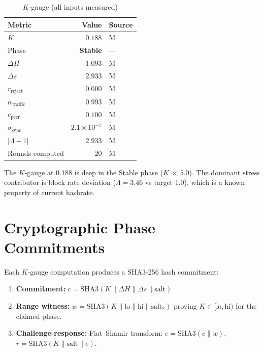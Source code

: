 \documentclass[11pt,a4paper,twocolumn]{article}
\begin{document}
\begin{table}[H]
\centering
\caption{$K$-gauge (all inputs \textcolor{measured}{measured})}
\label{tab:klive}
\begin{tabular}{@{}lrl@{}}
\toprule
\textbf{Metric} & \textbf{Value} & \textbf{Source} \\
\midrule
$K$                  & $0.188$       & \textcolor{measured}{M} \\
Phase                & \textbf{Stable} & --- \\
$\Delta H$           & $1.093$       & \textcolor{measured}{M} \\
$\Delta s$           & $2.933$       & \textcolor{measured}{M} \\
$r_{\text{reject}}$  & $0.000$       & \textcolor{measured}{M} \\
$\alpha_{\text{traffic}}$ & $0.993$  & \textcolor{measured}{M} \\
$c_{\text{peer}}$    & $0.100$       & \textcolor{measured}{M} \\
$\sigma_{\text{sync}}$ & $2.1\!\times\!10^{-7}$ & \textcolor{measured}{M} \\
$|\Lambda - 1|$      & $2.933$       & \textcolor{measured}{M} \\
Rounds computed      & $20$          & \textcolor{measured}{M} \\
\bottomrule
\end{tabular}
\end{table}

The $K$-gauge at 0.188 is deep in the Stable phase ($K \ll 5.0$). The dominant stress contributor is block rate deviation ($\Lambda = 3.46$ vs target 1.0), which is a known property of current hashrate.

\section{Cryptographic Phase Commitments}

Each $K$-gauge computation produces a SHA3-256 hash commitment:

\begin{enumerate}[nosep]
    \item \textbf{Commitment:} $c = \text{SHA3}(K \| \Delta H \| \Delta s \| \text{salt})$
    \item \textbf{Range witness:} $w = \text{SHA3}(K \| \text{lo} \| \text{hi} \| \text{salt}_2)$ proving $K \in [\text{lo}, \text{hi})$ for the claimed phase.
    \item \textbf{Challenge-response:} Fiat--Shamir transform: $e = \text{SHA3}(c \| w)$, $r = \text{SHA3}(K \| \text{salt} \| e)$.
\end{enumerate}
\end{document}
